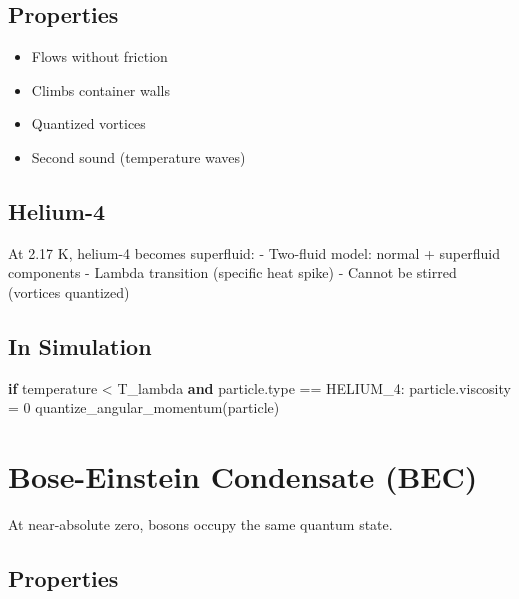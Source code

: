 \documentclass[
  11pt,
  letterpaper,
  twoside,
  openright]{book}
\newenvironment{Shaded}{\begin{snugshade}}{\end{snugshade}}
\newcommand{\BuiltInTok}[1]{\textcolor[rgb]{0.00,0.23,0.31}{#1}}
\newcommand{\ControlFlowTok}[1]{\textcolor[rgb]{0.00,0.23,0.31}{\textbf{#1}}}
\newcommand{\DecValTok}[1]{\textcolor[rgb]{0.68,0.00,0.00}{#1}}
\newcommand{\KeywordTok}[1]{\textcolor[rgb]{0.00,0.23,0.31}{\textbf{#1}}}
\newcommand{\NormalTok}[1]{\textcolor[rgb]{0.00,0.23,0.31}{#1}}
\newcommand{\OperatorTok}[1]{\textcolor[rgb]{0.37,0.37,0.37}{#1}}
\providecommand{\tightlist}{%
  \setlength{\itemsep}{0pt}\setlength{\parskip}{0pt}}
\begin{document}
\subsection{Properties}\label{properties-6}

\begin{itemize}
\tightlist
\item
  Flows without friction
\item
  Climbs container walls
\item
  Quantized vortices
\item
  Second sound (temperature waves)
\end{itemize}

\subsection{Helium-4}\label{helium-4}

At 2.17 K, helium-4 becomes superfluid: - Two-fluid model: normal +
superfluid components - Lambda transition (specific heat spike) - Cannot
be stirred (vortices quantized)

\subsection{In Simulation}\label{in-simulation-1}

\begin{Shaded}
\begin{Highlighting}[]
\ControlFlowTok{if}\NormalTok{ temperature }\OperatorTok{\textless{}}\NormalTok{ T\_lambda }\KeywordTok{and}\NormalTok{ particle.}\BuiltInTok{type} \OperatorTok{==}\NormalTok{ HELIUM\_4:}
\NormalTok{    particle.viscosity }\OperatorTok{=} \DecValTok{0}
\NormalTok{    quantize\_angular\_momentum(particle)}
\end{Highlighting}
\end{Shaded}

\section{Bose-Einstein Condensate
(BEC)}\label{bose-einstein-condensate-bec}

At near-absolute zero, bosons occupy the same quantum state.

\subsection{Properties}\label{properties-7}
\end{document}

